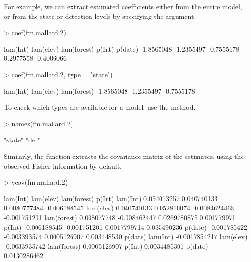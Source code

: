 \documentclass[article,shortnames]{jss}
\begin{document}
For example, we can extract estimated coefficients either from the
entire model, or from the state or detection levels by specifying the
 argument.

\begin{Schunk}
\begin{Sinput}
> coef(fm.mallard.2)
\end{Sinput}
\begin{Soutput}
   lam(Int)   lam(elev) lam(forest)      p(Int)     p(date) 
 -1.8565048  -1.2355497  -0.7555178   0.2977558  -0.4006066 
\end{Soutput}
\begin{Sinput}
> coef(fm.mallard.2, type = "state")
\end{Sinput}
\begin{Soutput}
   lam(Int)   lam(elev) lam(forest) 
 -1.8565048  -1.2355497  -0.7555178 
\end{Soutput}
\end{Schunk}

To check which types are available for a model, use the  method.

\begin{Schunk}
\begin{Sinput}
> names(fm.mallard.2)
\end{Sinput}
\begin{Soutput}
[1] "state" "det"  
\end{Soutput}
\end{Schunk}

Similarly, the  function extracts the covariance matrix of
the estimates, using the observed Fisher information by default.

\begin{Schunk}
\begin{Sinput}
> vcov(fm.mallard.2)
\end{Sinput}
\begin{Soutput}
                lam(Int)    lam(elev)   lam(forest)       p(Int)
lam(Int)     0.054013257  0.040740133  0.0080777484 -0.006188545
lam(elev)    0.040740133  0.052810074 -0.0084624468 -0.001751201
lam(forest)  0.008077748 -0.008462447  0.0269780875  0.001779971
p(Int)      -0.006188545 -0.001751201  0.0017799714  0.035490236
p(date)     -0.001785422 -0.003393574  0.0005126907  0.003448530
                  p(date)
lam(Int)    -0.0017854217
lam(elev)   -0.0033935742
lam(forest)  0.0005126907
p(Int)       0.0034485301
p(date)      0.0130286462
\end{Soutput}
\end{Schunk}
\end{document}
